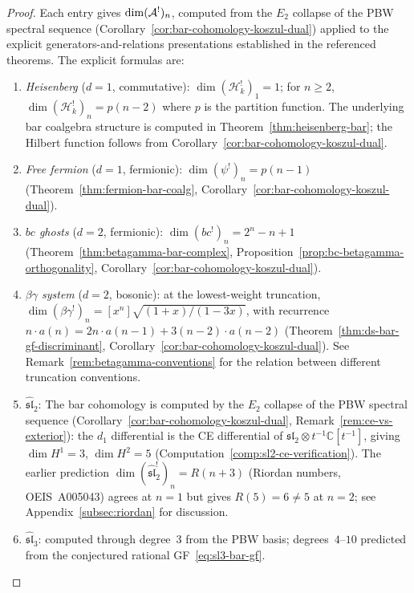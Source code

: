 \begin{proof}
Each entry gives $\dim (\mathcal{A}^!)_n$, computed from the
$E_2$ collapse of the PBW spectral sequence
(Corollary~\ref{cor:bar-cohomology-koszul-dual}) applied to
the explicit generators-and-relations presentations established
in the referenced theorems.
The explicit formulas are:
\begin{enumerate}
\item \emph{Heisenberg} ($d = 1$, commutative):
  $\dim (\mathcal{H}_k^!)_1 = 1$; for $n \geq 2$,
  $\dim (\mathcal{H}_k^!)_n = p(n-2)$ where $p$ is the partition function.
  The underlying bar coalgebra structure is computed in
  Theorem~\ref{thm:heisenberg-bar}; the Hilbert function follows
  from Corollary~\ref{cor:bar-cohomology-koszul-dual}.
\item \emph{Free fermion} ($d = 1$, fermionic):
  $\dim (\psi^!)_n = p(n-1)$
  (Theorem~\ref{thm:fermion-bar-coalg},
  Corollary~\ref{cor:bar-cohomology-koszul-dual}).
\item \emph{$bc$ ghosts} ($d = 2$, fermionic):
  $\dim (bc^!)_n = 2^n - n + 1$
  (Theorem~\ref{thm:betagamma-bar-complex},
  Proposition~\ref{prop:bc-betagamma-orthogonality},
  Corollary~\ref{cor:bar-cohomology-koszul-dual}).
\item \emph{$\beta\gamma$ system} ($d = 2$, bosonic):
  at the lowest-weight truncation,
  $\dim (\beta\gamma^!)_n = [x^n]\sqrt{(1{+}x)/(1{-}3x)}$,
  with recurrence $n \cdot a(n) = 2n \cdot a(n{-}1) + 3(n{-}2) \cdot a(n{-}2)$
  (Theorem~\ref{thm:ds-bar-gf-discriminant},
  Corollary~\ref{cor:bar-cohomology-koszul-dual}).
  See Remark~\ref{rem:betagamma-conventions}
  for the relation between different truncation conventions.
\item \emph{$\widehat{\mathfrak{sl}}_2$}:
  The bar cohomology is computed by the $E_2$ collapse
  of the PBW spectral sequence
  (Corollary~\ref{cor:bar-cohomology-koszul-dual},
  Remark~\ref{rem:ce-vs-exterior}): the $d_1$
  differential is the CE differential of
  $\mathfrak{sl}_2 \otimes t^{-1}\mathbb{C}[t^{-1}]$,
  giving $\dim H^1 = 3$, $\dim H^2 = 5$
  (Computation~\ref{comp:sl2-ce-verification}).
  The earlier prediction
  $\dim (\widehat{\mathfrak{sl}}_2^!)_n = R(n+3)$
  (Riordan numbers, OEIS~A005043) agrees at $n = 1$
  but gives $R(5) = 6 \neq 5$ at $n = 2$; see
  Appendix~\ref{subsec:riordan} for discussion.
\item \emph{$\widehat{\mathfrak{sl}}_3$}: computed through
  degree~$3$ from the PBW basis;
  degrees~$4$--$10$ predicted from the conjectured
  rational GF~\eqref{eq:sl3-bar-gf}.

\end{enumerate}
\end{proof}
